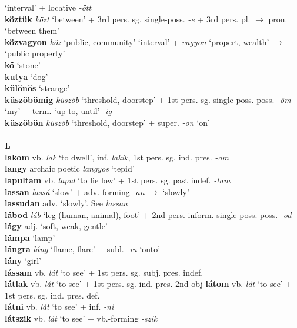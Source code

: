 \documentclass[11pt]{article}
\begin{document}
  `interval' + locative \emph{-ött} \\
\textbf{köztük} \emph{közt} `between' + 3rd
pers. sg. single\hyp{}poss. \emph{-e} + 3rd pers. pl. $\rightarrow$
pron. `between them' \\
\textbf{közvagyon} \emph{köz} `public, community' \textbar\textbar{}
`interval' + \emph{vagyon} `propert, wealth' $\rightarrow$ `public
property' \\
\textbf{kő} `stone' \\
\textbf{kutya} `dog' \\
\textbf{különös} `strange' \\
\textbf{küszöbömig} \emph{küszöb} `threshold, doorstep' + 1st
pers. sg. single\hyp{}poss. poss. \emph{-öm} `my' + term. `up to,
until' \emph{-ig} \\
\textbf{küszöbön} \emph{küszöb} `threshold, doorstep' +
super. \emph{-on} `on' \\
\ \\
\noindent \textbf{\large L} \\
\textbf{lakom} vb. \emph{lak} `to dwell', inf. \emph{lakik}, 1st
pers. sg. ind. pres. \emph{-om} \\
\textbf{langy} archaic poetic \emph{langyos} `tepid' \\
\textbf{lapultam} vb. \emph{lapul} `to lie low' + 1st pers. sg. past
indef. \emph{-tam} \\
\textbf{lassan} \emph{lassú} `slow' + adv.\hyp{}forming \emph{-an}
$\rightarrow$ `slowly' \\
\textbf{lassudan} adv. `slowly'. See \emph{lassan} \\
\textbf{lábod} \emph{láb} `leg (human, animal), foot' + 2nd
pers. inform. single\hyp{}poss. poss. \emph{-od} \\
\textbf{lágy} adj. `soft, weak, gentle' \\
\textbf{lámpa} `lamp' \\
\textbf{lángra} \emph{láng} `flame, flare' + subl. \emph{-ra}
`onto' \\
\textbf{lány} `girl' \\
\textbf{lássam} vb. \emph{lát} `to see' + 1st
pers. sg. subj. pres. indef. \\
\textbf{látlak} vb. \emph{lát} `to see' + 1st pers. sg. ind. pres. 2nd obj
\textbf{látom} vb. \emph{lát} `to see' + 1st
pers. sg. ind. pres. def. \\
\textbf{látni} vb. \emph{lát} `to see' + inf. \emph{-ni} \\
\textbf{látszik} vb. \emph{lát} `to see' + vb.-forming \emph{-szik}
\end{document}
